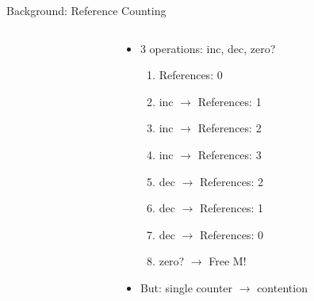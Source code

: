 \documentclass[aspectratio=169]{beamer}
\newcommand{\bi}{\begin{itemize}}
\newcommand{\ei}{\end{itemize}}
\newcommand{\bn}{\begin{enumerate}}
\newcommand{\en}{\end{enumerate}}
\begin{document}
\begin{frame}{Background: Reference Counting}
  \begin{columns}[T]
    \begin{column}{0.1\textwidth}
        \vspace{2cm}
    \end{column}
    \begin{column}{0.6\textwidth}
      \bi
    \item 3 operations: inc, dec, zero?
      \pause
      \bn
    \item References: 0
      \pause
    \item inc $\rightarrow$ References: 1
      \pause
    \item inc $\rightarrow$ References: 2
      \pause
    \item inc $\rightarrow$ References: 3
      \pause
    \item dec $\rightarrow$ References: 2
      \pause
    \item dec $\rightarrow$ References: 1
      \pause
    \item dec $\rightarrow$ References: 0
      \pause
    \item zero? $\rightarrow$ Free M!
      \en
      \pause
    \item But: single counter $\rightarrow$ contention
      \ei
    \end{column}
  \end{columns}
\end{frame}
\end{document}
